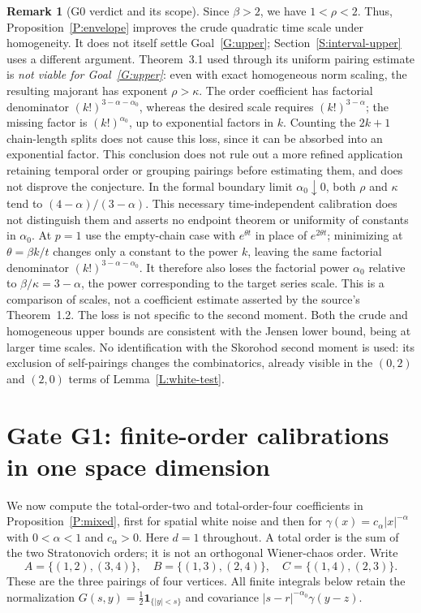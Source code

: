 \documentclass[12pt]{article}
\numberwithin{equation}{section}
\theoremstyle{definition}
\newtheorem{remark}[theorem]{Remark}
\begin{document}
\begin{remark}[G0 verdict and its scope]\label{R:G0-verdict}
  Since $\beta>2$, we have $1<\rho<2$. Thus,
  Proposition~\ref{P:envelope} improves the crude quadratic time scale
  under homogeneity. It does not itself settle Goal~\ref{G:upper};
  Section~\ref{S:interval-upper} uses a different argument.
  Theorem~3.1 used through its uniform pairing estimate is \emph{not
  viable for Goal~\ref{G:upper}}: even with exact homogeneous norm
  scaling, the resulting majorant has exponent $\rho>\kappa$.
  The order coefficient has factorial denominator $(k!)^{3-\alpha-\alpha_0}$,
  whereas the desired scale requires $(k!)^{3-\alpha}$; the missing
  factor is $(k!)^{\alpha_0}$, up to exponential factors in $k$.
  Counting the $2k+1$ chain-length splits does not cause this loss,
  since it can be absorbed into an exponential factor.
  This conclusion does not rule out a more refined application retaining
  temporal order or grouping pairings before estimating them, and does not
  disprove the conjecture. In the formal boundary limit
  $\alpha_0\downarrow0$, both $\rho$ and $\kappa$ tend to
  $(4-\alpha)/(3-\alpha)$. This necessary time-independent calibration
  does not distinguish them and asserts no endpoint theorem or uniformity
  of constants in $\alpha_0$. At $p=1$ use the empty-chain case with
  $e^{\theta t}$ in place of $e^{2\theta t}$; minimizing at
  $\theta=\beta k/t$ changes only a constant to the power $k$, leaving
  the same factorial denominator $(k!)^{3-\alpha-\alpha_0}$.
  It therefore also loses the factorial power $\alpha_0$ relative to
  $\beta/\kappa=3-\alpha$, the power corresponding to the target
  series scale. This is a comparison of scales, not a coefficient estimate
  asserted by the source's Theorem~1.2. The loss is not specific to the
  second moment. Both the crude and homogeneous upper bounds are
  consistent with the Jensen lower bound, being at larger time scales.
  No identification with the Skorohod second moment is used: its exclusion
  of self-pairings changes the combinatorics, already visible in the
  $(0,2)$ and $(2,0)$ terms of Lemma~\ref{L:white-test}.
\end{remark}

\section{Gate G1: finite-order calibrations in one space dimension}\label{S:G1}

We now compute the total-order-two and total-order-four coefficients in
Proposition~\ref{P:mixed}, first for spatial white noise and then for
$\gamma(x)=c_\alpha|x|^{-\alpha}$ with $0<\alpha<1$ and $c_\alpha>0$.
Here $d=1$ throughout. A total order is the sum of the two Stratonovich
orders; it is not an orthogonal Wiener-chaos order. Write
\[
  A=\{(1,2),(3,4)\},\quad B=\{(1,3),(2,4)\},\quad
  C=\{(1,4),(2,3)\}.
\]
These are the three pairings of four vertices. All finite integrals below
retain the normalization $G(s,y)=\frac12\mathbf1_{\{|y|<s\}}$ and
covariance $|s-r|^{-\alpha_0}\gamma(y-z)$.
\end{document}
